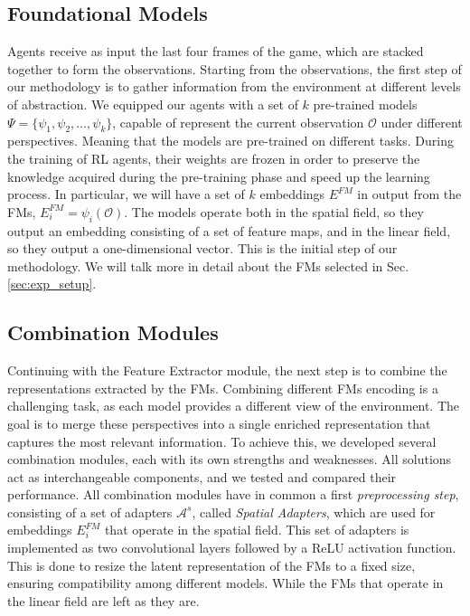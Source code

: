 \subsection{Foundational Models}\label{subsec:foundational-models}
Agents receive as input the last four frames of the game, which are stacked together to form the observations.
Starting from the observations, the first step of our methodology is to gather information from the environment at different levels of abstraction.
We equipped our agents with a set of $k$ pre-trained models $\Psi = \{\psi_1, \psi_2, \ldots, \psi_k\}$, capable of represent the current observation $\mathcal{O}$ under different perspectives.
Meaning that the models are pre-trained on different tasks.
During the training of RL agents, their weights are frozen in order to preserve the knowledge acquired during the pre-training phase and speed up the learning process.
In particular, we will have a set of $k$ embeddings $E^{FM}$ in output from the FMs, $E^{FM}_i = \psi_i(\mathcal{O})$.
The models operate both in the spatial field, so they output an embedding consisting of a set of feature maps, and in the linear field, so they output a one-dimensional vector.
This is the initial step of our methodology.
We will talk more in detail about the FMs selected in Sec. \ref{sec:exp_setup}.

\subsection{Combination Modules}\label{subsec:combination-modules}
Continuing with the Feature Extractor module, the next step is to combine the representations extracted by the FMs.
Combining different FMs encoding is a challenging task, as each model provides a different view of the environment.
The goal is to merge these perspectives into a single enriched representation that captures the most relevant information.
To achieve this, we developed several combination modules, each with its own strengths and weaknesses.
All solutions act as interchangeable components, and we tested and compared their performance.
All combination modules have in common a first \textit{preprocessing step}, consisting of a set of adapters $\mathcal{A}^{s}$, called \textit{Spatial Adapters}, which are used for embeddings $E^{FM}_i$ that operate in the spatial field.
This set of adapters is implemented as two convolutional layers followed by a ReLU activation function.
This is done to resize the latent representation of the FMs to a fixed size, ensuring compatibility among different models.
While the FMs that operate in the linear field are left as they are.

